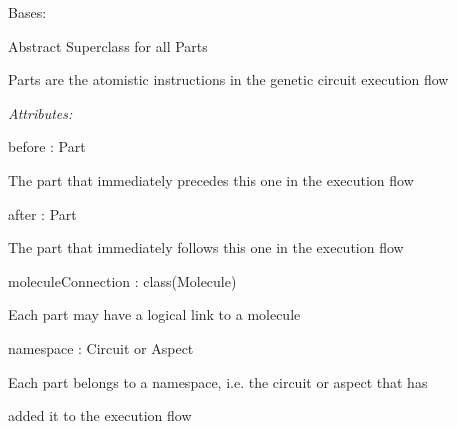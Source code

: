 \documentclass[letterpaper,10pt,english]{sphinxmanual}
\begin{document}
\begin{fulllineitems}
\label{modules/index:aosb.core.Part}
Bases: 

Abstract Superclass for all Parts

Parts are the atomistic instructions in the genetic circuit execution flow

\begin{DUlineblock}{0em}
\item[] \emph{Attributes:}
\item[]
\begin{DUlineblock}{\DUlineblockindent}
\item[] before : Part
\item[]
\begin{DUlineblock}{\DUlineblockindent}
\item[] The part that immediately precedes this one in the execution flow
\end{DUlineblock}
\item[] after : Part
\item[]
\begin{DUlineblock}{\DUlineblockindent}
\item[] The part that immediately follows this one in the execution flow
\end{DUlineblock}
\item[] moleculeConnection : class(Molecule)
\item[]
\begin{DUlineblock}{\DUlineblockindent}
\item[] Each part may have a logical link to a molecule 
\end{DUlineblock}
\item[] namespace : Circuit or Aspect
\item[]
\begin{DUlineblock}{\DUlineblockindent}
\item[] Each part belongs to a namespace, i.e. the circuit or aspect that has
\item[] added it to the execution flow
\end{DUlineblock}
\end{DUlineblock}
\end{DUlineblock}

\begin{fulllineitems}
\label{modules/index:aosb.core.Part.after}
\end{fulllineitems}


\end{fulllineitems}
\end{document}

